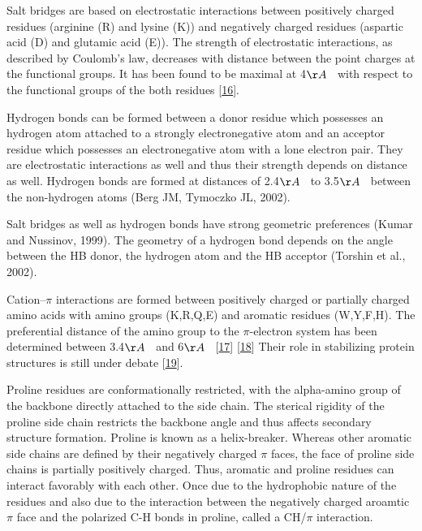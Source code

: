 \documentclass[12pt,a4paper,twoside]{book}
\theoremstyle{definition}
\theoremstyle{definition}
\theoremstyle{remark}
\begin{document}
Salt bridges are based on electrostatic interactions between positively
charged residues (arginine (R) and lysine (K)) and negatively charged
residues (aspartic acid (D) and glutamic acid (E)). The strength of
electrostatic interactions, as described by Coulomb's law, decreases
with distance between the point charges at the functional groups. It has
been found to be maximal at 4\(\AA \; \;\) with respect to the
functional groups of the both residues
{[}\protect\hyperlink{ref-Donald2011}{16}{]}.

Hydrogen bonds can be formed between a donor residue which possesses an
hydrogen atom attached to a strongly electronegative atom and an
acceptor residue which possesses an electronegative atom with a lone
electron pair. They are electrostatic interactions as well and thus
their strength depends on distance as well. Hydrogen bonds are formed at
distances of 2.4\(\AA \; \;\) to 3.5\(\AA \; \;\) between the
non-hydrogen atoms (Berg JM, Tymoczko JL, 2002).

Salt bridges as well as hydrogen bonds have strong geometric preferences
(Kumar and Nussinov, 1999). The geometry of a hydrogen bond depends on
the angle between the HB donor, the hydrogen atom and the HB acceptor
(Torshin et al., 2002).

Cation--\(\pi\) interactions are formed between positively charged or
partially charged amino acids with amino groups (K,R,Q,E) and aromatic
residues (W,Y,F,H). The preferential distance of the amino group to the
\(\pi\)-electron system has been determined between 3.4\(\AA \; \;\) and
6\(\AA \; \;\) {[}\protect\hyperlink{ref-Burley1986}{17}{]}
{[}\protect\hyperlink{ref-Crowley2005}{18}{]} Their role in stabilizing
protein structures is still under debate
{[}\protect\hyperlink{ref-Slutsky2004}{19}{]}.

Proline residues are conformationally restricted, with the alpha-amino
group of the backbone directly attached to the side chain. The sterical
rigidity of the proline side chain restricts the backbone angle and thus
affects secondary structure formation. Proline is known as a
helix-breaker. Whereas other aromatic side chains are defined by their
negatively charged \(\pi\) faces, the face of proline side chains is
partially positively charged. Thus, aromatic and proline residues can
interact favorably with each other. Once due to the hydrophobic nature
of the residues and also due to the interaction between the negatively
charged aroamtic \(\pi\) face and the polarized C-H bonds in proline,
called a CH/\(\pi\) interaction.
\end{document}
